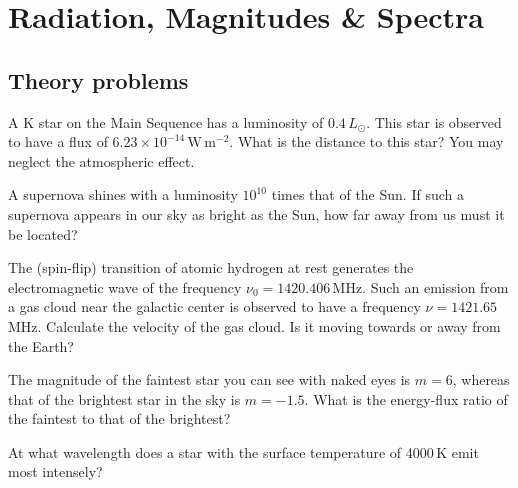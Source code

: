 \chapter{Radiation, Magnitudes \& Spectra}

\section*{Theory problems}

A K star on the Main Sequence has a luminosity of $0.4\,L_\odot$. This star
is observed to have a flux of $6.23 \times 10^{-14}\,\mathrm{W\,m^{-2}}$.
What is the distance to this star? You may neglect the atmospheric effect.

A supernova shines with a luminosity $10^{10}$ times that of the Sun. If
such a supernova appears in our sky as bright as the Sun, how far away from
us must it be located?

The (spin-flip) transition of atomic hydrogen at rest generates the
electromagnetic wave of the frequency $\nu_0 = 1420.406$\,MHz. Such an
emission from a gas cloud near the galactic center is observed to have a
frequency $\nu = 1421.65$\,MHz. Calculate the velocity of the gas cloud. Is
it moving towards or away from the Earth?

The magnitude of the faintest star you can see with naked eyes is $m = 6$,
whereas that of the brightest star in the sky is $m = -1.5$. What is the
energy-flux ratio of the faintest to that of the brightest?

At what wavelength does a star with the surface temperature of 4000\,K emit
most intensely?

